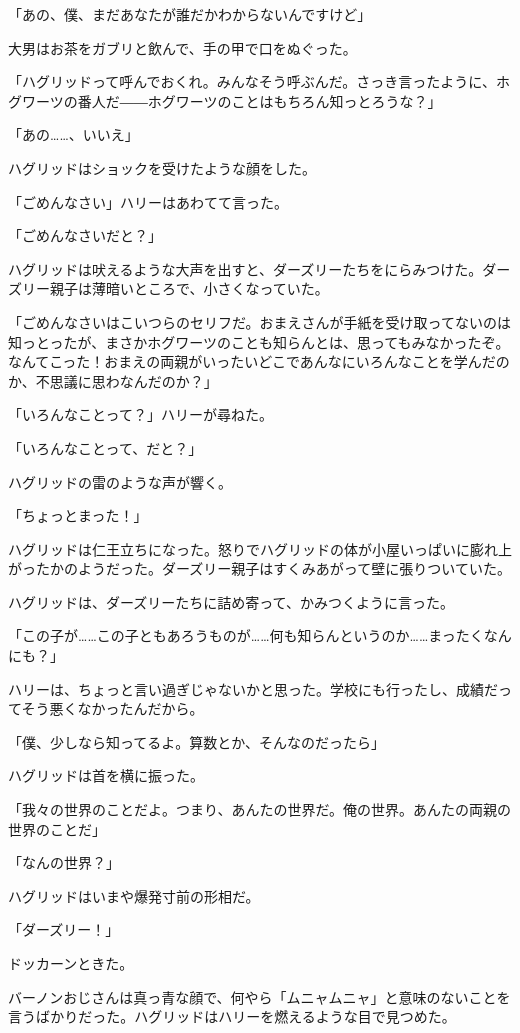 \documentclass[10pt,a4paper]{article}
\begin{document}
\begin{CJK}{UTF8}{min}
「あの、僕、まだあなたが誰だかわからないんですけど」

大男はお茶をガブリと飲んで、手の甲で口をぬぐった。

「ハグリッドって呼んでおくれ。みんなそう呼ぶんだ。さっき言ったように、ホグワーツの番人だ――ホグワーツのことはもちろん知っとろうな？」

「あの……、いいえ」

ハグリッドはショックを受けたような顔をした。

「ごめんなさい」ハリーはあわてて言った。

「ごめんなさいだと？」

ハグリッドは吠えるような大声を出すと、ダーズリーたちをにらみつけた。ダーズリー親子は薄暗いところで、小さくなっていた。

「ごめんなさいはこいつらのセリフだ。おまえさんが手紙を受け取ってないのは知っとったが、まさかホグワーツのことも知らんとは、思ってもみなかったぞ。なんてこった！おまえの両親がいったいどこであんなにいろんなことを学んだのか、不思議に思わなんだのか？」

「いろんなことって？」ハリーが尋ねた。

「いろんなことって、だと？」

ハグリッドの雷のような声が響く。

「ちょっとまった！」

ハグリッドは仁王立ちになった。怒りでハグリッドの体が小屋いっぱいに膨れ上がったかのようだった。ダーズリー親子はすくみあがって壁に張りついていた。

ハグリッドは、ダーズリーたちに詰め寄って、かみつくように言った。

「この子が……この子ともあろうものが……何も知らんというのか……まったくなんにも？」

ハリーは、ちょっと言い過ぎじゃないかと思った。学校にも行ったし、成績だってそう悪くなかったんだから。

「僕、少しなら知ってるよ。算数とか、そんなのだったら」

ハグリッドは首を横に振った。

「我々の世界のことだよ。つまり、あんたの世界だ。俺の世界。あんたの両親の世界のことだ」

「なんの世界？」

ハグリッドはいまや爆発寸前の形相だ。

「ダーズリー！」

ドッカーンときた。

バーノンおじさんは真っ青な顔で、何やら「ムニャムニャ」と意味のないことを言うばかりだった。ハグリッドはハリーを燃えるような目で見つめた。


\end{CJK}
\end{document}

